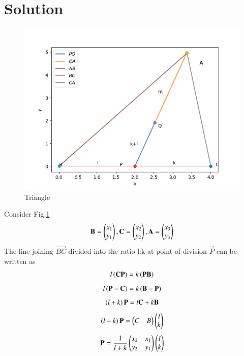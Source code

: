 \documentclass[journal,12pt,twocolumn]{IEEEtran}
\begin{document}
\section{Solution}
\begin{figure}[h!]
       \centering
        \includegraphics[width =\linewidth]{Figure_1.png}
        \caption{Triangle}\label{t1}
\end{figure}
Consider Fig.\ref{t1}
\begin{align}
    \mathbf{B}=\begin{pmatrix}x_1\\y_1\end{pmatrix},
    \mathbf{C}=\begin{pmatrix}x_2\\y_2\end{pmatrix},
     \mathbf{A}=\begin{pmatrix}x_3\\y_3\end{pmatrix}
\end{align}
The line joining  $\vec{BC}$ divided into the ratio l:k at point of division $\vec{P}$ can be written as
\begin{align}
    l\left(\mathbf{CP}\right)=k\left(\mathbf{PB}\right)
\end{align}
\begin{align}
    l\left(\mathbf{P-C}\right)=k\left(\mathbf{B-P}\right)
\end{align}
\begin{align}
    \left(l+k\right)\mathbf{P}=l\mathbf{C}+k\mathbf{B}
\end{align}
\begin{align}
    \left(l+k\right)\mathbf{P}=\begin{pmatrix}C & B\end{pmatrix}\begin{pmatrix}l\\k\end{pmatrix}
\end{align}
\begin{align}
     \mathbf{P}=\frac{1}{l+k}\begin{pmatrix}x_2&x_1\\y_2&y_1\end{pmatrix}\begin{pmatrix}l\\k\end{pmatrix}
\end{align}
\end{document}
